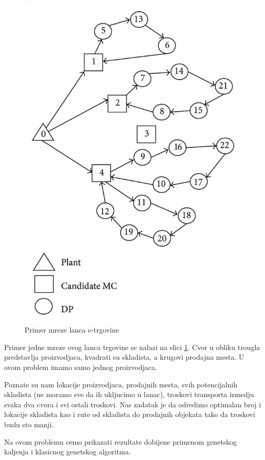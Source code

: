 \documentclass[a4paper]{article}
\begin{document}
\begin{figure}[h!]
\centering
\includegraphics[scale=0.25]{LIRP_Primer_Grafa.jpg}
\caption{Primer mreze lanca e-trgovine}
\label{fig:2}
\end{figure}
\newpage
Primer jedne mreze ovog lanca trgovine se nalazi na slici \ref{fig:2}. Cvor u obliku trougla predstavlja proizvodjaca, kvadrati su skladista, a krugovi prodajna mesta. U ovom problem imamo samo jednog proizvodjaca. \par
Poznate su nam lokacije proizvodjaca, prodajnih mesta, svih potencijalnih skladista (ne moramo sve da ih ukljucimo u lanac), troskovi transporta izmedju svaka dva cvora i svi ostali troskovi. Nas zadatak je da odredimo optimalan broj i lokacije skladista kao i rute od skladista do prodajnih objekata tako da troskovi budu sto manji. \par
Na ovom problemu cemo prikazati rezultate dobijene primenom genetskog kaljenja i klasicnog genetskog algoritma. \\  \par
\end{document}
